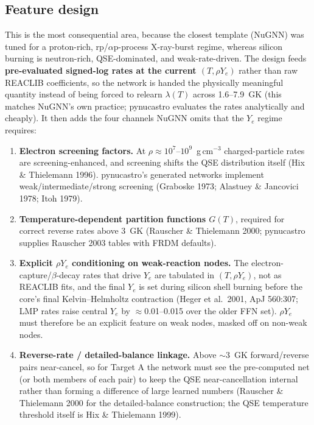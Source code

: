 \documentclass[11pt]{article}
\newcommand{\Ye}{Y_{e}}
\begin{document}
\subsection{Feature design}

This is the most consequential area, because the closest template (NuGNN) was tuned for a proton-rich, rp/$\alpha$p-process X-ray-burst regime, whereas silicon burning is neutron-rich, QSE-dominated, and weak-rate-driven. The design feeds \textbf{pre-evaluated signed-log rates at the current $(T, \rho\Ye)$} rather than raw REACLIB coefficients, so the network is handed the physically meaningful quantity instead of being forced to relearn $\lambda(T)$ across 1.6--7.9~GK (this matches NuGNN's own practice; pynucastro evaluates the rates analytically and cheaply). It then adds the four channels NuGNN omits that the $\Ye$ regime requires:

\begin{enumerate}[leftmargin=*]
  \item \textbf{Electron screening factors.} At $\rho \approx 10^{7}$--$10^{9}$~g\,cm$^{-3}$ charged-particle rates are screening-enhanced, and screening shifts the QSE distribution itself (Hix \& Thielemann 1996). pynucastro's generated networks implement weak/intermediate/strong screening (Graboske 1973; Alastuey \& Jancovici 1978; Itoh 1979).
  \item \textbf{Temperature-dependent partition functions $G(T)$}, required for correct reverse rates above 3~GK (Rauscher \& Thielemann 2000; pynucastro supplies Rauscher 2003 tables with FRDM defaults).
  \item \textbf{Explicit $\rho\Ye$ conditioning on weak-reaction nodes.} The electron-capture/$\beta$-decay rates that drive $\Ye$ are tabulated in $(T, \rho\Ye)$, not as REACLIB fits, and the final $\Ye$ is set during silicon shell burning before the core's final Kelvin--Helmholtz contraction (Heger et al.\ 2001, ApJ 560:307; LMP rates raise central $\Ye$ by $\approx$0.01--0.015 over the older FFN set). $\rho\Ye$ must therefore be an explicit feature on weak nodes, masked off on non-weak nodes.
  \item \textbf{Reverse-rate / detailed-balance linkage.} Above $\sim$3~GK forward/reverse pairs near-cancel, so for Target A the network must see the pre-computed net (or both members of each pair) to keep the QSE near-cancellation internal rather than forming a difference of large learned numbers (Rauscher \& Thielemann 2000 for the detailed-balance construction; the QSE temperature threshold itself is Hix \& Thielemann 1999).
\end{enumerate}
\end{document}
